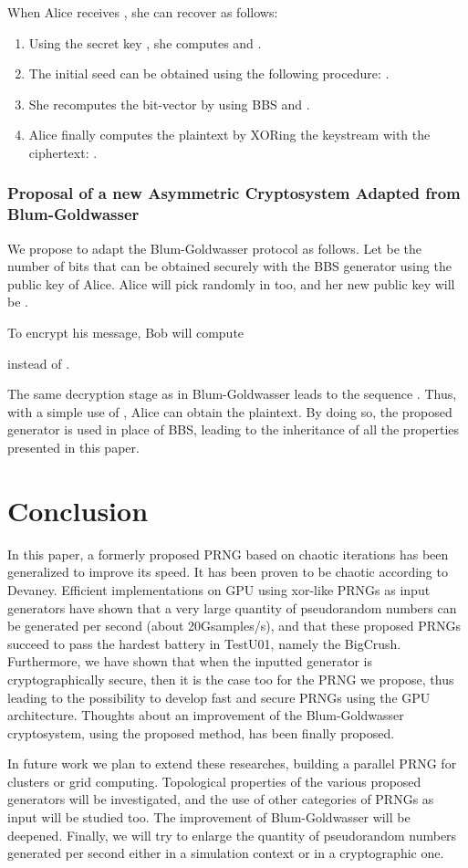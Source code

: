 \documentclass{article}
\begin{document}
When Alice receives , she can recover  as follows:
\begin{enumerate}
\item Using the secret key , she computes  and .
\item The initial seed can be obtained using the following procedure: .
\item She recomputes the bit-vector  by using BBS and .
\item Alice finally computes the plaintext by XORing the keystream with the ciphertext: .
\end{enumerate}


\subsubsection{Proposal of a new Asymmetric Cryptosystem Adapted from Blum-Goldwasser}

We propose to adapt the Blum-Goldwasser protocol as follows. 
Let  be the number of bits that can
be obtained securely with the BBS generator using the public key  of Alice.
Alice will pick randomly  in  too, and
her new public key will be .

To encrypt his message, Bob will compute

instead of . 

The same decryption stage as in Blum-Goldwasser leads to the sequence 
.
Thus, with a simple use of , Alice can obtain the plaintext.
By doing so, the proposed generator is used in place of BBS, leading to
the inheritance of all the properties presented in this paper.

\section{Conclusion}


In  this  paper, a formerly proposed PRNG based on chaotic iterations
has been generalized to improve its speed. It has been proven to be
chaotic according to Devaney.
Efficient implementations on  GPU using xor-like  PRNGs as input generators
have shown that a very large quantity of pseudorandom numbers can be generated per second (about
20Gsamples/s), and that these proposed PRNGs succeed to pass the hardest battery in TestU01,
namely the BigCrush.
Furthermore, we have shown that when the inputted generator is cryptographically
secure, then it is the case too for the PRNG we propose, thus leading to
the possibility to develop fast and secure PRNGs using the GPU architecture.
Thoughts about an improvement of the Blum-Goldwasser cryptosystem, using the 
proposed method, has been finally proposed.

In future  work we plan to extend these researches, building a parallel PRNG for  clusters or
grid computing. Topological properties of the various proposed generators will be investigated,
and the use of other categories of PRNGs as input will be studied too. The improvement
of Blum-Goldwasser will be deepened. Finally, we
will try to enlarge the quantity of pseudorandom numbers generated per second either
in a simulation context or in a cryptographic one.



 

\end{document}
